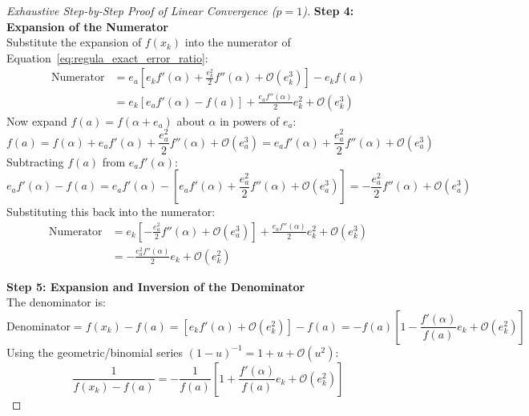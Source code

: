 \begin{proof}[Exhaustive Step-by-Step Proof of Linear Convergence ($p = 1$)]
\noindent\textbf{Step 4: Expansion of the Numerator} \\
Substitute the expansion of $f(x_k)$ into the numerator of Equation~\eqref{eq:regula_exact_error_ratio}:
\begin{align}
    \text{Numerator} &= e_a \left[ e_k f'(\alpha) + \frac{e_k^2}{2} f''(\alpha) + \mathcal{O}(e_k^3) \right] - e_k f(a) \nonumber \\
    &= e_k \left[ e_a f'(\alpha) - f(a) \right] + \frac{e_a f''(\alpha)}{2} e_k^2 + \mathcal{O}(e_k^3)
\end{align}
Now expand $f(a) = f(\alpha + e_a)$ about $\alpha$ in powers of $e_a$:
\begin{equation}
    f(a) = f(\alpha) + e_a f'(\alpha) + \frac{e_a^2}{2} f''(\alpha) + \mathcal{O}(e_a^3) = e_a f'(\alpha) + \frac{e_a^2}{2} f''(\alpha) + \mathcal{O}(e_a^3)
\end{equation}
Subtracting $f(a)$ from $e_a f'(\alpha)$:
\begin{equation}
    e_a f'(\alpha) - f(a) = e_a f'(\alpha) - \left[ e_a f'(\alpha) + \frac{e_a^2}{2} f''(\alpha) + \mathcal{O}(e_a^3) \right] = -\frac{e_a^2}{2} f''(\alpha) + \mathcal{O}(e_a^3)
\end{equation}
Substituting this back into the numerator:
\begin{align}
    \text{Numerator} &= e_k \left[ -\frac{e_a^2}{2} f''(\alpha) + \mathcal{O}(e_a^3) \right] + \frac{e_a f''(\alpha)}{2} e_k^2 + \mathcal{O}(e_k^3) \nonumber \\
    &= -\frac{e_a^2 f''(\alpha)}{2} e_k + \mathcal{O}(e_k^2)
\end{align}

\noindent\textbf{Step 5: Expansion and Inversion of the Denominator} \\
The denominator is:
\begin{equation}
    \text{Denominator} = f(x_k) - f(a) = \left[ e_k f'(\alpha) + \mathcal{O}(e_k^2) \right] - f(a) = -f(a) \left[ 1 - \frac{f'(\alpha)}{f(a)} e_k + \mathcal{O}(e_k^2) \right]
\end{equation}
Using the geometric/binomial series $(1 - u)^{-1} = 1 + u + \mathcal{O}(u^2)$:
\begin{equation}
    \frac{1}{f(x_k) - f(a)} = -\frac{1}{f(a)} \left[ 1 + \frac{f'(\alpha)}{f(a)} e_k + \mathcal{O}(e_k^2) \right]
\end{equation}


\end{proof}
